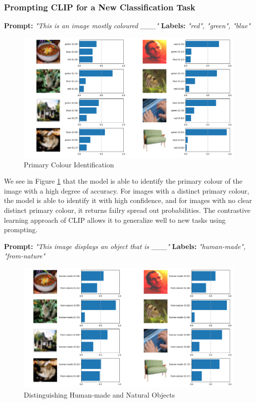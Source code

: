 \documentclass[a4paper]{article}
\begin{document}
\subsubsection{Prompting CLIP for a New Classification Task}
\textbf{Prompt:} \textit{"This is an image mostly coloured \_\_\_"}\newline
\textbf{Labels:} \textit{"red", "green", "blue"}
\begin{figure}[h]
    \centering
    \includegraphics[width=0.75\linewidth]{"imgs/cifar100-test_red,green,blue.png"}
    \caption{Primary Colour Identification}
    \label{fig:CLIP-primary-colour}
\end{figure}

We see in Figure \ref{fig:CLIP-primary-colour} that the model is able to identify the primary colour of the image
with a high degree of accuracy. For images with a distinct primary colour, the model is able to identify it with
high confidence, and for images with no clear distinct primary colour, it returns failry spread out probabilities.
The contrastive learning approach of CLIP allows it to generalize well to new tasks using prompting.
\bigskip

\textbf{Prompt:} \textit{"This image displays an object that is \_\_\_"}\newline
\textbf{Labels:} \textit{"human-made", "from-nature"}
\begin{figure}[h]
    \centering
    \includegraphics[width=0.75\linewidth]{"imgs/cifar100-test_human-made,from-nature.png"}
    \caption{Distinguishing Human-made and Natural Objects}
    \label{fig:CLIP-human-vs-nature}
\end{figure}
\end{document}
